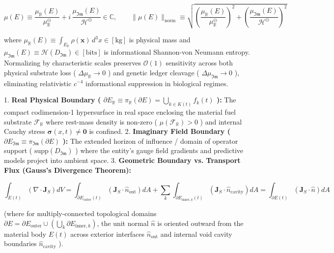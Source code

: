 \documentclass[11pt,a4paper]{article}
\theoremstyle{definition}
\theoremstyle{remark}
\begin{document}
\begin{equation}
\boxed{\mu(E) \equiv \frac{\mu_{\mathbb{R}}(E)}{\mu_{\mathbb{R}}^\ominus} + i \, \frac{\mu_{\mathfrak{Im}}(E)}{\mathcal{H}^\ominus} \in \mathbb{C}, \qquad \|\mu(E)\|_{\text{norm}} \equiv \sqrt{\left(\frac{\mu_{\mathbb{R}}(E)}{\mu_{\mathbb{R}}^\ominus}\right)^2 + \left(\frac{\mu_{\mathfrak{Im}}(E)}{\mathcal{H}^\ominus}\right)^2}}
\end{equation}


where $\mu_{\mathbb{R}}(E) \equiv \int_{E_{\mathbb{R}}} \rho(\mathbf{x}) \, d^3x \in [\mathrm{kg}]$ is physical mass and $\mu_{\mathfrak{Im}}(E) \equiv \mathcal{H}(D_{\mathfrak{Im}}) \in [\mathrm{bits}]$ is informational Shannon-von Neumann entropy. Normalizing by characteristic scales preserves $\mathcal{O}(1)$ sensitivity across both physical substrate loss ( $\Delta \mu_{\mathbb{R}} \to 0$ ) and genetic ledger cleavage ( $\Delta \mu_{\mathfrak{Im}} \to 0$ ), eliminating relativistic $c^{-4}$ informational suppression in biological regimes.

1. \textbf{Real Physical Boundary ( $\partial E_{\mathbb{R}} \equiv \pi_{\mathbb{R}}(\partial E) = \bigcup_{k \in K(t)} f_k(t)$ ):}
The compact codimension-1 hypersurface in real space enclosing the material fuel substrate $\mathcal{F}_{\mathbb{R}}$ where rest-mass density is non-zero ( $\mu(\mathcal{F}_{\mathbb{R}}) > 0$ ) and internal Cauchy stress $\boldsymbol{\sigma}(x, t) \neq \mathbf{0}$ is confined.
2. \textbf{Imaginary Field Boundary ( $\partial E_{\mathfrak{Im}} \equiv \pi_{\mathfrak{Im}}(\partial E)$ ):}
The extended horizon of influence / domain of operator support ( $\text{supp}(D_{\mathfrak{Im}})$ ) where the entity's gauge field gradients and predictive models project into ambient space.
3. \textbf{Geometric Boundary vs. Transport Flux (Gauss's Divergence Theorem):}


\begin{equation}
\boxed{\int_{E(t)} \left( \nabla \cdot \mathbf{J}_S \right) dV = \int_{\partial E_{\text{outer}}(t)} \left( \mathbf{J}_S \cdot \hat{n}_{\text{out}} \right) dA + \sum_k \int_{\partial E_{\text{inner}, k}(t)} \left( \mathbf{J}_S \cdot \hat{n}_{\text{cavity}} \right) dA = \int_{\partial E(t)} \left( \mathbf{J}_S \cdot \hat{n} \right) dA}
\end{equation}


(where for multiply-connected topological domains $\partial E = \partial E_{\text{outer}} \cup (\bigcup_k \partial E_{\text{inner}, k})$, the unit normal $\hat{n}$ is oriented outward from the material body $E(t)$ across exterior interfaces $\hat{n}_{\text{out}}$ and internal void cavity boundaries $\hat{n}_{\text{cavity}}$ ).
\end{document}
